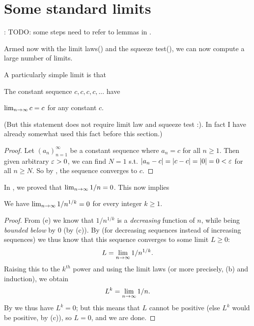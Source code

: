 \section{Some standard limits} \label{sec 6.5}

\begin{note}
: TODO: some steps need to refer to lemmas in .
\end{note}

Armed now with the limit laws() and the squeeze test(), we can now compute a large number of limits.

A particularly simple limit is that
\begin{additional corollary} \label{ac 6.5.1}
The constant sequence \(c, c, c, c, ...\) have
\begin{center}
    \(\lim_{n \to \infty} c = c\) for any constant \(c\).
\end{center}
(But this statement does not require limit law and squeeze test :).
In fact I have already somewhat used this fact before this section.)
\end{additional corollary}

\begin{proof}
Let \((a_n)_{n = 1}^{\infty}\) be a constant sequence where \(a_n = c\) for all \(n \ge 1\).
Then given arbitrary \(\varepsilon > 0\), we can find \(N = 1\) s.t. \(\lvert a_n - c\rvert = \lvert c - c\rvert = \lvert0\rvert = 0 < \varepsilon\) for all \(n \ge N\).
So by , the sequence converges to \(c\).
\end{proof}

In , we proved that \(\lim_{n \to \infty} 1/n = 0\).
This now implies

\begin{corollary} \label{corollary 6.5.1}
We have \(\lim_{n \to \infty} 1/n^{1/k} = 0\) for every integer \(k \ge 1\).
\end{corollary}

\begin{proof}
From (e) we know that \(1/n^{1/k}\) is a \emph{decreasing} function of \(n\), while being \emph{bounded below} by \(0\) (by (c)).
By  (for decreasing sequences instead of increasing sequences) we thus know that this sequence converges to some limit \(L \ge 0\):
\[
    L = \lim_{n \to \infty} 1/n^{1/k}.
\]
Raising this to the \(k^{th}\) power and using the limit laws (or more precisely, (b) and induction), we obtain
\[
    L^k = \lim_{n \to \infty} 1/n.
\]
By  we thus have \(L^k = 0\);
but this means that \(L\) cannot be positive (else \(L^k\) would be positive, by (c)), so \(L = 0\), and we are done.
\end{proof}

